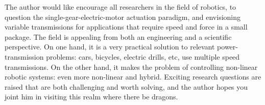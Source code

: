 The author would like encourage all researchers in the field of robotics, to question the single-gear-electric-motor actuation paradigm, and envisioning variable transmissions for applications that require speed and force in a small package. The field is appealing from both an engineering and a scientific perspective. On one hand, it is a very practical solution to relevant power-transmission problems: cars, bicycles, electric drills, etc, use multiple speed transmissions. On the other hand, it makes the problem of controlling non-linear robotic systems: even more non-linear and hybrid. Exciting research questions are raised that are both challenging and worth solving, and the author hopes you joint him in visiting this realm where there be dragons.






